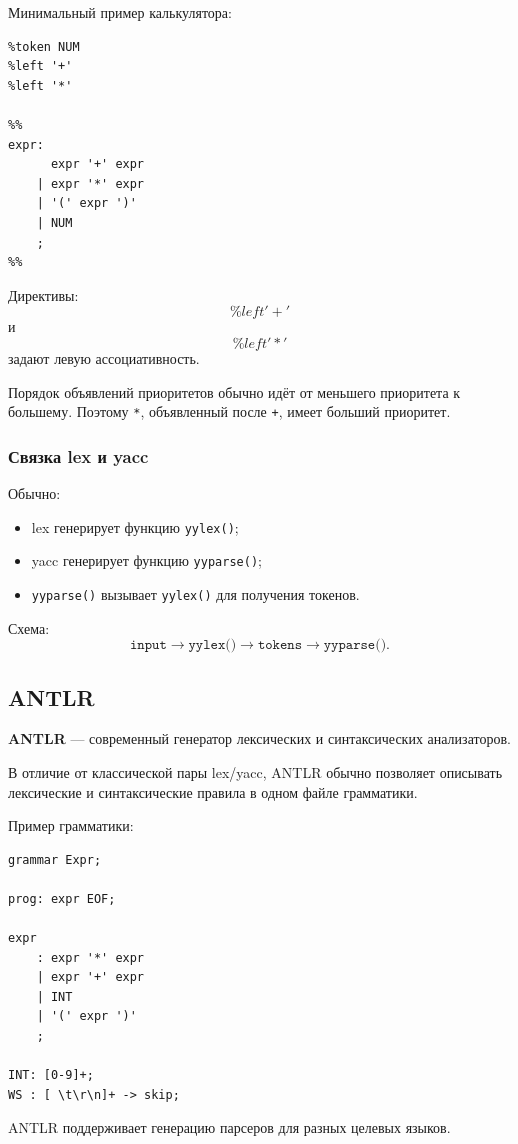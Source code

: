 \documentclass[12pt,a4paper]{article}
\theoremstyle{definition}
\theoremstyle{plain}
\begin{document}
Минимальный пример калькулятора:

\begin{verbatim}
%token NUM
%left '+'
%left '*'

%%
expr:
      expr '+' expr
    | expr '*' expr
    | '(' expr ')'
    | NUM
    ;
%%
\end{verbatim}

Директивы:
\[
\%left '+'
\]
и
\[
\%left '*'
\]
задают левую ассоциативность.

Порядок объявлений приоритетов обычно идёт от меньшего приоритета к большему. Поэтому \texttt{*}, объявленный после \texttt{+}, имеет больший приоритет.

\subsubsection*{Связка lex и yacc}

Обычно:
\begin{itemize}
    \item lex генерирует функцию \texttt{yylex()};
    \item yacc генерирует функцию \texttt{yyparse()};
    \item \texttt{yyparse()} вызывает \texttt{yylex()} для получения токенов.
\end{itemize}

Схема:
\[
\texttt{input}
\to
\texttt{yylex()}
\to
\texttt{tokens}
\to
\texttt{yyparse()}.
\]

\subsection{ANTLR}

\textbf{ANTLR} --- современный генератор лексических и синтаксических анализаторов.

В отличие от классической пары lex/yacc, ANTLR обычно позволяет описывать лексические и синтаксические правила в одном файле грамматики.

Пример грамматики:

\begin{verbatim}
grammar Expr;

prog: expr EOF;

expr
    : expr '*' expr
    | expr '+' expr
    | INT
    | '(' expr ')'
    ;

INT: [0-9]+;
WS : [ \t\r\n]+ -> skip;
\end{verbatim}

ANTLR поддерживает генерацию парсеров для разных целевых языков.
\end{document}

